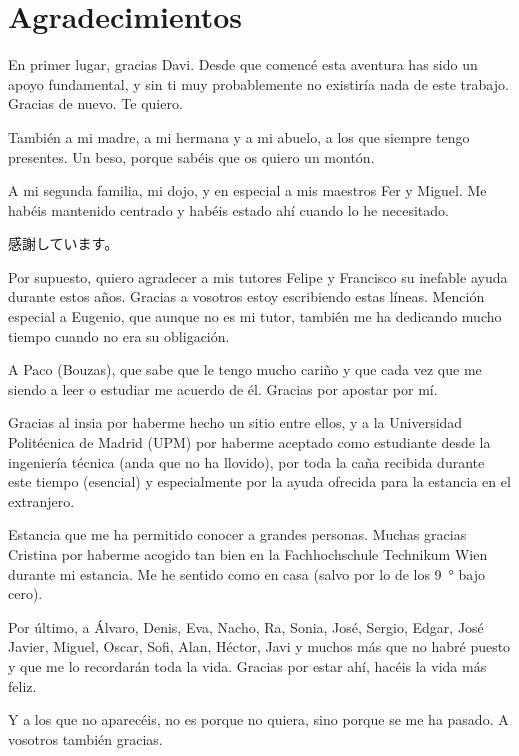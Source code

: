 \cleardoublepage
\thispagestyle{empty}
\chapter*{Agradecimientos}
\begin{fullwidth}
	En primer lugar, gracias Davi. Desde que comencé esta aventura has sido un apoyo fundamental, y sin ti muy probablemente no existiría nada de este trabajo. Gracias de nuevo. Te quiero.

	También a mi madre, a mi hermana y a mi abuelo, a los que siempre tengo presentes. Un beso, porque sabéis que os quiero un montón.
	
	A mi segunda familia, mi dojo, y en especial a mis maestros Fer y Miguel. Me habéis mantenido centrado y habéis estado ahí cuando lo he necesitado. \begin{CJK}{UTF8}{min}感謝しています。\end{CJK}
	
	Por supuesto, quiero agradecer a mis tutores Felipe y Francisco su inefable ayuda durante estos años. Gracias a vosotros estoy escribiendo estas líneas. Mención especial a Eugenio, que aunque no es mi tutor, también me ha dedicando mucho tiempo cuando no era su obligación.

	A Paco (Bouzas), que sabe que le tengo mucho cariño y que cada vez que me siendo a leer o estudiar me acuerdo de él. Gracias por apostar por mí.
	
	Gracias al \Acrfull{insia} por haberme hecho un sitio entre ellos, y a la Universidad Politécnica de Madrid (UPM) por haberme aceptado como estudiante desde la ingeniería técnica (anda que no ha llovido), por toda la caña recibida durante este tiempo (esencial) y especialmente por la ayuda ofrecida para la estancia en el extranjero.
	
	Estancia que me ha permitido conocer a grandes personas. Muchas gracias Cristina por haberme acogido tan bien en la Fachhochschule Technikum Wien durante mi estancia. Me he sentido como en casa (salvo por lo de los \SI{9}{\degree} bajo cero).
	
	Por último, a Álvaro, Denis, Eva, Nacho, Ra, Sonia, José, Sergio, Edgar, José Javier, Miguel, Oscar, Sofi, Alan, Héctor, Javi y muchos más que no habré puesto y que me lo recordarán toda la vida. Gracias por estar ahí, hacéis la vida más feliz.

	Y a los que no aparecéis, no es porque no quiera, sino porque se me ha pasado. A vosotros también gracias.
\end{fullwidth}